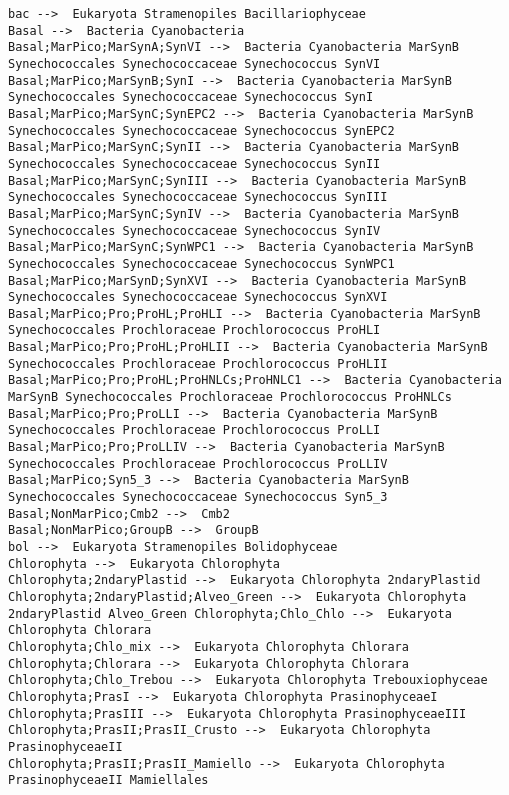 \documentclass{article}
\begin{document}
\begin{lstlisting}[language=shellcmd,caption={Extracting only Photosynthetic sequences using shell commands}]
bac -->  Eukaryota Stramenopiles Bacillariophyceae 
Basal -->  Bacteria Cyanobacteria 
Basal;MarPico;MarSynA;SynVI -->  Bacteria Cyanobacteria MarSynB Synechococcales Synechococcaceae Synechococcus SynVI
Basal;MarPico;MarSynB;SynI -->  Bacteria Cyanobacteria MarSynB Synechococcales Synechococcaceae Synechococcus SynI
Basal;MarPico;MarSynC;SynEPC2 -->  Bacteria Cyanobacteria MarSynB Synechococcales Synechococcaceae Synechococcus SynEPC2
Basal;MarPico;MarSynC;SynII -->  Bacteria Cyanobacteria MarSynB Synechococcales Synechococcaceae Synechococcus SynII
Basal;MarPico;MarSynC;SynIII -->  Bacteria Cyanobacteria MarSynB Synechococcales Synechococcaceae Synechococcus SynIII
Basal;MarPico;MarSynC;SynIV -->  Bacteria Cyanobacteria MarSynB Synechococcales Synechococcaceae Synechococcus SynIV
Basal;MarPico;MarSynC;SynWPC1 -->  Bacteria Cyanobacteria MarSynB Synechococcales Synechococcaceae Synechococcus SynWPC1
Basal;MarPico;MarSynD;SynXVI -->  Bacteria Cyanobacteria MarSynB Synechococcales Synechococcaceae Synechococcus SynXVI
Basal;MarPico;Pro;ProHL;ProHLI -->  Bacteria Cyanobacteria MarSynB Synechococcales Prochloraceae Prochlorococcus ProHLI
Basal;MarPico;Pro;ProHL;ProHLII -->  Bacteria Cyanobacteria MarSynB Synechococcales Prochloraceae Prochlorococcus ProHLII
Basal;MarPico;Pro;ProHL;ProHNLCs;ProHNLC1 -->  Bacteria Cyanobacteria MarSynB Synechococcales Prochloraceae Prochlorococcus ProHNLCs
Basal;MarPico;Pro;ProLLI -->  Bacteria Cyanobacteria MarSynB Synechococcales Prochloraceae Prochlorococcus ProLLI
Basal;MarPico;Pro;ProLLIV -->  Bacteria Cyanobacteria MarSynB Synechococcales Prochloraceae Prochlorococcus ProLLIV
Basal;MarPico;Syn5_3 -->  Bacteria Cyanobacteria MarSynB Synechococcales Synechococcaceae Synechococcus Syn5_3
Basal;NonMarPico;Cmb2 -->  Cmb2
Basal;NonMarPico;GroupB -->  GroupB
bol -->  Eukaryota Stramenopiles Bolidophyceae 
Chlorophyta -->  Eukaryota Chlorophyta 
Chlorophyta;2ndaryPlastid -->  Eukaryota Chlorophyta 2ndaryPlastid 
Chlorophyta;2ndaryPlastid;Alveo_Green -->  Eukaryota Chlorophyta 2ndaryPlastid Alveo_Green Chlorophyta;Chlo_Chlo -->  Eukaryota Chlorophyta Chlorara 
Chlorophyta;Chlo_mix -->  Eukaryota Chlorophyta Chlorara 
Chlorophyta;Chlorara -->  Eukaryota Chlorophyta Chlorara 
Chlorophyta;Chlo_Trebou -->  Eukaryota Chlorophyta Trebouxiophyceae 
Chlorophyta;PrasI -->  Eukaryota Chlorophyta PrasinophyceaeI 
Chlorophyta;PrasIII -->  Eukaryota Chlorophyta PrasinophyceaeIII 
Chlorophyta;PrasII;PrasII_Crusto -->  Eukaryota Chlorophyta PrasinophyceaeII 
Chlorophyta;PrasII;PrasII_Mamiello -->  Eukaryota Chlorophyta PrasinophyceaeII Mamiellales

\end{lstlisting}
\end{document}
